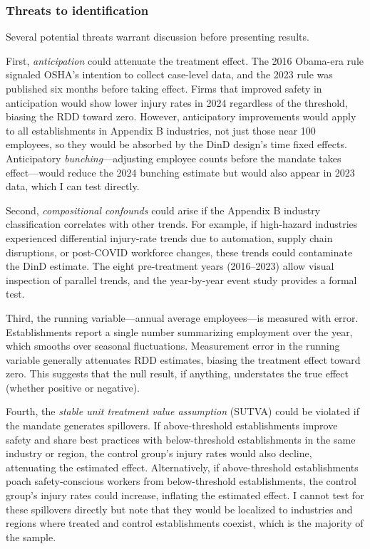 \documentclass[12pt]{article}
\begin{document}
\subsubsection*{Threats to identification} Several potential threats warrant discussion before presenting results.

First, \textit{anticipation} could attenuate the treatment effect. The 2016 Obama-era rule signaled OSHA's intention to collect case-level data, and the 2023 rule was published six months before taking effect. Firms that improved safety in anticipation would show lower injury rates in 2024 regardless of the threshold, biasing the RDD toward zero. However, anticipatory improvements would apply to all establishments in Appendix B industries, not just those near 100 employees, so they would be absorbed by the DinD design's time fixed effects. Anticipatory \textit{bunching}---adjusting employee counts before the mandate takes effect---would reduce the 2024 bunching estimate but would also appear in 2023 data, which I can test directly.

Second, \textit{compositional confounds} could arise if the Appendix B industry classification correlates with other trends. For example, if high-hazard industries experienced differential injury-rate trends due to automation, supply chain disruptions, or post-COVID workforce changes, these trends could contaminate the DinD estimate. The eight pre-treatment years (2016--2023) allow visual inspection of parallel trends, and the year-by-year event study provides a formal test.

Third, the running variable---annual average employees---is measured with error. Establishments report a single number summarizing employment over the year, which smooths over seasonal fluctuations. Measurement error in the running variable generally attenuates RDD estimates, biasing the treatment effect toward zero. This suggests that the null result, if anything, understates the true effect (whether positive or negative).

Fourth, the \textit{stable unit treatment value assumption} (SUTVA) could be violated if the mandate generates spillovers. If above-threshold establishments improve safety and share best practices with below-threshold establishments in the same industry or region, the control group's injury rates would also decline, attenuating the estimated effect. Alternatively, if above-threshold establishments poach safety-conscious workers from below-threshold establishments, the control group's injury rates could increase, inflating the estimated effect. I cannot test for these spillovers directly but note that they would be localized to industries and regions where treated and control establishments coexist, which is the majority of the sample.
\end{document}
